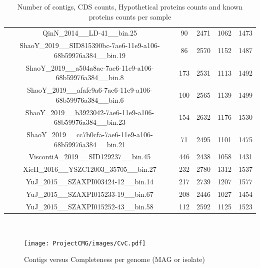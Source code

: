 \documentclass[11pt]{article}
\begin{document}
\begin{landscape}
\begin{table}[h!]
\begin{center}
\begin{tabular}{|c|c|c|c|c|}
        QinN\_2014\_\_LD-41\_\_bin.25 & 90 & 2471 & 1062 & 1473\\
        ShaoY\_2019\_\_SID815390bc-7ae6-11e9-a106-68b59976a384\_\_bin.19 & 86 & 2570 & 1152 & 1487\\
        ShaoY\_2019\_\_a504a8ac-7ae6-11e9-a106-68b59976a384\_\_bin.8 & 173 & 2531 & 1113 & 1492\\
        ShaoY\_2019\_\_afafe9a6-7ae6-11e9-a106-68b59976a384\_\_bin.6 & 100 & 2565 & 1139 & 1499\\
        ShaoY\_2019\_\_b3923042-7ae6-11e9-a106-68b59976a384\_\_bin.23 & 154 & 2632 & 1176 & 1530\\
        ShaoY\_2019\_\_cc7b0cfa-7ae6-11e9-a106-68b59976a384\_\_bin.21  & 71 & 2495 & 1101 & 1475\\
        ViscontiA\_2019\_\_SID129237\_\_bin.45 & 446 & 2438 & 1058 & 1431\\
        XieH\_2016\_\_YSZC12003\_35705\_\_bin.27 & 232 & 2780 & 1312 & 1537\\
        YuJ\_2015\_\_SZAXPI003424-12\_\_bin.14 & 217 & 2739 & 1207 & 1577\\
        YuJ\_2015\_\_SZAXPI015233-19\_\_bin.67 & 208 & 2446 & 1027 & 1454\\
        YuJ\_2015\_\_SZAXPI015252-43\_\_bin.58 & 112 & 2592 & 1125 & 1523\\
        \hline
    \end{tabular}\\
    \caption{Number of contigs, CDS counts, Hypothetical proteins counts and known proteins counts per sample}
    \label{Table:prokka}
\end{center}   
\end{table}
\end{landscape}

\newpage
\begin{figure}[!htb]
     \centering
     \texttt{[image: ProjectCMG/images/CvC.pdf]}
     \caption{Contigs versus Completeness per genome (MAG or isolate)}\label{fig:CvsC}
\end{figure}
\end{document}
